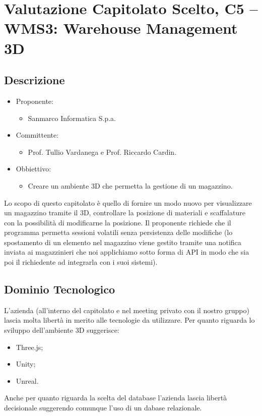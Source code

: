 \documentclass[a4paper, twoside]{article}
\begin{document}
\large

\newpage %




\section{Valutazione Capitolato Scelto, C5 -- WMS3: Warehouse Management 3D}
    \subsection{Descrizione}
        \begin{itemize}
            \item Proponente:
            \begin{itemize}
                \item Sanmarco Informatica S.p.a.
            \end{itemize}
            \item Committente:
            \begin{itemize}
                \item Prof. Tullio Vardanega e Prof.
                Riccardo Cardin.
            \end{itemize}
            \item Obbiettivo:
            \begin{itemize}
                \item Creare un ambiente 3D che permetta la gestione
                di un magazzino.
            \end{itemize}
        \end{itemize}
        Lo scopo di questo capitolato è quello di fornire un
        modo nuovo per visualizzare un magazzino tramite il
        3D, controllare la posizione di materiali e scaffalature con
        la possibilità di modificarne la posizione.
        Il proponente richiede che il programma permetta sessioni
        volatili senza persistenza delle modifiche (lo spostamento di
        un elemento nel magazzino viene gestito tramite una notifica
        inviata ai magazzinieri che noi applichiamo sotto forma di API
        in modo che sia poi il richiedente ad integrarla con i suoi
        sistemi).
    \subsection{Dominio Tecnologico}
        L'azienda (all'interno del capitolato e nel meeting privato
        con il nostro gruppo) lascia molta libertà in merito alle
        tecnologie da utilizzare. Per quanto riguarda lo sviluppo
        dell'ambiente 3D suggerisce:
        \begin{itemize}
            \item Three.js;
            \item Unity;
            \item Unreal.
        \end{itemize}
        Anche per quanto riguarda la scelta del database l'azienda
        lascia libertà decisionale suggerendo comunque l'uso di un
        dabase relazionale.
\end{document}
